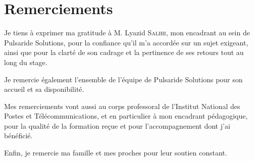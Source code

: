 \chapter*{Remerciements}


Je tiens à exprimer ma gratitude à M. Lyazid \textsc{Salihi}, mon encadrant au sein de
Pulsaride Solutions, pour la confiance qu'il m'a accordée sur un sujet exigeant, ainsi que
pour la clarté de son cadrage et la pertinence de ses retours tout au long du stage.

Je remercie également l'ensemble de l'équipe de Pulsaride Solutions pour son accueil et sa
disponibilité.

Mes remerciements vont aussi au corps professoral de l'Institut National des Postes et
Télécommunications, et en particulier à mon encadrant pédagogique, pour la qualité de la
formation reçue et pour l'accompagnement dont j'ai bénéficié.

Enfin, je remercie ma famille et mes proches pour leur soutien constant.
